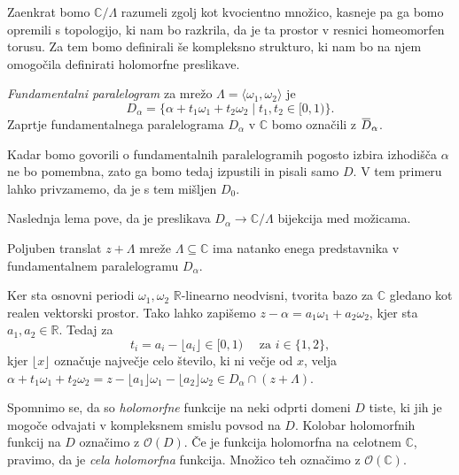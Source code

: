 \documentclass[mat1]{fmfdelo}
\numberwithin{equation}{section}
\newcommand{\R}{\mathbb R}
\newcommand{\C}{\mathbb C}
\newcommand{\om}{\omega}
\newcommand{\hol}[1]{\mathcal{O}(#1)}
\newcommand{\ols}[1]{\mskip.5\thinmuskip\overline{\mskip-.5\thinmuskip {#1} \mskip-.5\thinmuskip}\mskip.5\thinmuskip} %
\theoremstyle{definition}
\begin{document}
Zaenkrat bomo $\C/\Lambda$ razumeli zgolj kot kvocientno množico, kasneje pa ga bomo opremili s topologijo, ki nam bo razkrila, da je ta prostor v resnici homeomorfen torusu. Za tem bomo definirali še kompleksno strukturo, ki nam bo na njem omogočila definirati holomorfne preslikave.


\begin{definicija}
    \emph{Fundamentalni paralelogram} za mrežo $\Lambda = \langle \om_1, \om_2 \rangle$ je
    \[
        D_{\alpha} = \{\alpha + t_1 \om_1 + t_2 \om_2 \mid t_1, t_2 \in [0,1)\}.
    \]
    Zaprtje fundamentalnega paralelograma $D_\alpha$ v $\C$ bomo označili z $\ols{D}_\alpha$. 
\end{definicija}

\begin{opomba}
    Kadar bomo govorili o fundamentalnih paralelogramih pogosto izbira izhodišča $\alpha$ ne bo pomembna, zato ga bomo tedaj izpustili in pisali samo $D$. V tem primeru lahko privzamemo, da je s tem mišljen $D_0$. 
\end{opomba}

Naslednja lema pove, da je preslikava $D_\alpha \to \C/\Lambda$ bijekcija med možicama. 

\begin{lema}
    \label{enolicni predstavnik}
    Poljuben translat $z + \Lambda$ mreže $\Lambda \subseteq \C$ ima natanko enega predstavnika v fundamentalnem paralelogramu $D_\alpha$. 
\end{lema}

\begin{dokaz}
    Ker sta osnovni periodi $\omega_1, \omega_2$ $\R$-linearno neodvisni, tvorita bazo za $\C$ gledano kot realen vektorski prostor. Tako lahko zapišemo $z - \alpha = a_1 \om_1 + a_2 \om_2$, kjer sta $a_1, a_2 \in \R$. Tedaj za 
    \[
        t_i = a_i - \lfloor a_i \rfloor \in [0,1) \quad \text{ za $i \in \{1,2\}$},
    \] 
    kjer $\lfloor x \rfloor$ označuje največje celo število, ki ni večje od $x$, velja $\alpha + t_1\om_1 + t_2 \om_2 = z - \lfloor a_1 \rfloor \om_1 - \lfloor a_2 \rfloor \om_2 \in D_\alpha \cap (z + \Lambda)$.
\end{dokaz}

Spomnimo se, da so \emph{holomorfne} funkcije na neki odprti domeni $D$ tiste, ki jih je mogoče odvajati v kompleksnem smislu povsod na $D$. Kolobar holomorfnih funkcij na $D$ označimo z $\hol{D}$. Če je funkcija holomorfna na celotnem $\C$, pravimo, da je \emph{cela holomorfna} funkcija. Množico teh označimo z $\hol{\C}$.
\end{document}
